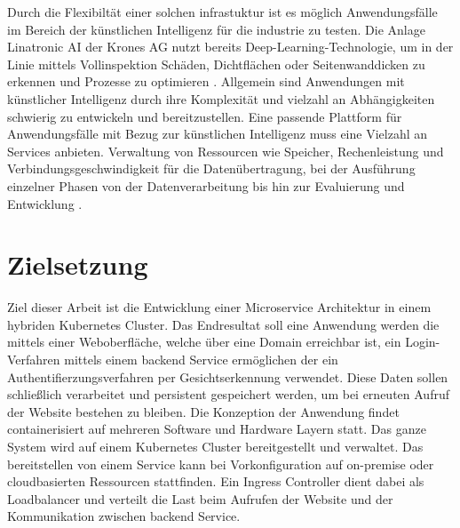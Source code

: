 Durch die Flexibiltät einer solchen infrastuktur ist es möglich Anwendungsfälle im Bereich
der künstlichen Intelligenz
für die industrie zu testen. Die Anlage Linatronic AI der Krones AG nutzt bereits Deep-Learning-Technologie,
um in der Linie mittels Vollinspektion Schäden, Dichtflächen oder Seitenwanddicken
zu erkennen und Prozesse zu optimieren \cite{linatronic}. Allgemein sind Anwendungen mit künstlicher Intelligenz durch ihre Komplexität
und vielzahl an Abhängigkeiten schwierig zu entwickeln und bereitzustellen. 
Eine passende Plattform für Anwendungsfälle mit Bezug zur künstlichen Intelligenz
muss eine Vielzahl an Services anbieten. Verwaltung von Ressourcen wie Speicher,
Rechenleistung und Verbindungsgeschwindigkeit für die Datenübertragung, 
bei der Ausführung einzelner Phasen von der Datenverarbeitung bis hin zur Evaluierung und Entwicklung
\cite{mlops}. 

\section{Zielsetzung}
Ziel dieser Arbeit ist die Entwicklung einer Microservice
Architektur in einem hybriden Kubernetes Cluster. Das Endresultat
soll eine Anwendung werden die mittels einer Weboberfläche, welche über eine Domain erreichbar ist,
ein Login-Verfahren mittels einem backend Service ermöglichen der ein Authentifierzungsverfahren
per Gesichtserkennung verwendet. 
Diese Daten sollen schließlich verarbeitet und persistent 
gespeichert werden, um bei erneuten Aufruf der Website bestehen zu bleiben.
Die Konzeption der Anwendung findet containerisiert auf mehreren Software und Hardware Layern
statt. 
Das ganze System wird auf einem Kubernetes Cluster bereitgestellt und verwaltet.
Das bereitstellen von einem Service kann bei Vorkonfiguration auf on-premise oder cloudbasierten Ressourcen stattfinden.
Ein Ingress Controller dient dabei als Loadbalancer und verteilt die Last beim 
Aufrufen der Website und der Kommunikation zwischen backend Service.

